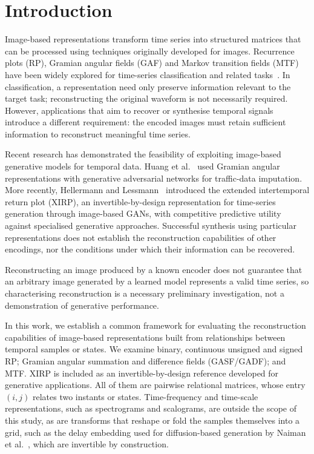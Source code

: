 \documentclass[preprint,review,12pt]{elsarticle}
\begin{document}
\section{Introduction}\label{sec:introduction}

Image-based representations transform time series into structured matrices that can be processed using techniques originally developed for images. Recurrence plots (RP), Gramian angular fields (GAF) and Markov transition fields (MTF) have been widely explored for time-series classification and related tasks~\cite{wang2015encoding,wang2015encoding2,eckmann1987recurrence,marwan2007recurrence}. In classification, a representation need only preserve information relevant to the target task; reconstructing the original waveform is not necessarily required. However, applications that aim to recover or synthesise temporal signals introduce a different requirement: the encoded images must retain sufficient information to reconstruct meaningful time series.

Recent research has demonstrated the feasibility of exploiting image-based generative models for temporal data. Huang et al.~\cite{huang2023tsdigan} used Gramian angular representations with generative adversarial networks for traffic-data imputation. More recently, Hellermann and Lessmann~\cite{hellermann2026imagegan} introduced the extended intertemporal return plot (XIRP), an invertible-by-design representation for time-series generation through image-based GANs, with competitive predictive utility against specialised generative approaches. Successful synthesis using particular representations does not establish the reconstruction capabilities of other encodings, nor the conditions under which their information can be recovered.

Reconstructing an image produced by a known encoder does not guarantee that an arbitrary image generated by a learned model represents a valid time series, so characterising reconstruction is a necessary preliminary investigation, not a demonstration of generative performance.

In this work, we establish a common framework for evaluating the reconstruction capabilities of image-based representations built from relationships between temporal samples or states. We examine binary, continuous unsigned and signed RP; Gramian angular summation and difference fields (GASF/GADF); and MTF. XIRP is included as an invertible-by-design reference developed for generative applications. All of them are pairwise relational matrices, whose entry $(i,j)$ relates two instants or states. Time-frequency and time-scale representations, such as spectrograms and scalograms, are outside the scope of this study, as are transforms that reshape or fold the samples themselves into a grid, such as the delay embedding used for diffusion-based generation by Naiman et al.~\cite{naiman2024imagentime}, which are invertible by construction.
\end{document}
